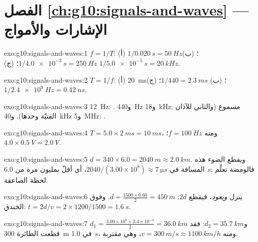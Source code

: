 \section*{الفصل \ref{ch:g10:signals-and-waves} --- الإشارات والأمواج}

\begin{solution}{exo:g10:signals-and-waves:1}
$f = 1/T$: (أ) $1/\qty{0.020}{s} = \qty{50}{Hz}$؛
(ب) $1/\qty{4.0e-3}{s} = \qty{250}{Hz}$؛
(ج) $1/\qty{5.0e-5}{s} = \qty{20}{kHz}$.
\end{solution}

\begin{solution}{exo:g10:signals-and-waves:2}
$T = 1/f$: (أ) \qty{20}{ms}؛ (ب) $1/440 = \qty{2.3}{ms}$؛
(ج) $1/\qty{2.4e9}{Hz} = \qty{0.42}{ns}$.
\end{solution}

\begin{solution}{exo:g10:signals-and-waves:3}
\qty{12}{Hz}: . و\qty{440}{Hz} و\qty{18}{kHz}: مسموع (والثاني
للآذان الفتيّة وحدها). و\qty{40}{kHz} و\qty{5}{MHz}: .
\end{solution}

\begin{solution}{exo:g10:signals-and-waves:4}
$T = 5.0 \times \qty{2}{ms} = \qty{10}{ms}$، ومنه $f = \qty{100}{Hz}$؛
 $4.0 \times \qty{0.5}{V} = \qty{2.0}{V}$.
\end{solution}

\begin{solution}{exo:g10:signals-and-waves:5}
$d = 340 \times 6.0 = \qty{2040}{m} \approx \qty{2.0}{km}$. ويقطع الضوء
هذه المسافة في $2040/(3.00\times10^{8}) \approx \qty{7}{\micro s}$، أي أقلّ بمليون
مرة من \qty{6.0}{s}: فالومضة تعلّم لحظة الصاعقة.
\end{solution}

\begin{solution}{exo:g10:signals-and-waves:6}
ينزل  \emph{ويعود}، فيقطع $2d$:
$d = \frac{1500 \times 0.60}{2} = \qty{450}{m}$. وفوق الخندق:
$t = 2d/v = 2 \times 1200/1500 = \qty{1.6}{s}$.
\end{solution}

\begin{solution}{exo:g10:signals-and-waves:7}
$d_1 = \frac{3.00\times10^{8} \times 2.4\times10^{-4}}{2} =
\qty{36.0}{km}$ و$d_2 = \qty{35.7}{km}$: فقد قطعت الطائرة
\qty{300}{m} في \qty{1.0}{s}، ومنه $v = \qty{300}{m/s} \approx
\qty{1100}{km/h}$، وهي مقتربة.
\end{solution}

